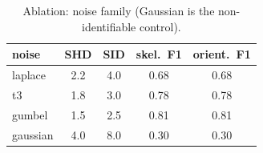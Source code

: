 \begin{table}[htbp]
\centering
\caption{Ablation: noise family (Gaussian is the non-identifiable control).}
\label{tab:abl_noise}
\begin{tabular}{lcccc}
\hline
noise & SHD & SID & skel.\ F1 & orient.\ F1 \\
\hline
laplace & 2.2 & 4.0 & 0.68 & 0.68 \\
t3 & 1.8 & 3.0 & 0.78 & 0.78 \\
gumbel & 1.5 & 2.5 & 0.81 & 0.81 \\
gaussian & 4.0 & 8.0 & 0.30 & 0.30 \\
\hline
\end{tabular}
\end{table}
